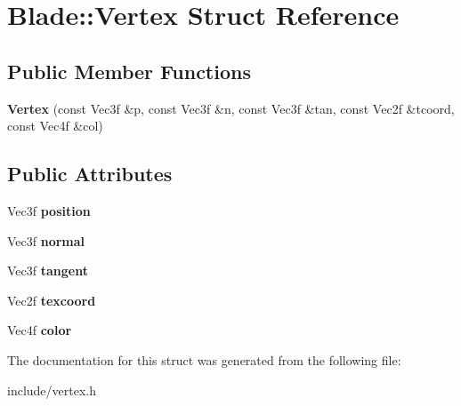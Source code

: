 \hypertarget{struct_blade_1_1_vertex}{}\section{Blade\+:\+:Vertex Struct Reference}
\label{struct_blade_1_1_vertex}
\subsection*{Public Member Functions}
\begin{DoxyCompactItemize}
\item 
\mbox{\label{struct_blade_1_1_vertex_a124be4a59e2e11a4c052c14c83dfa5b4}} 
{\bfseries Vertex} (const Vec3f \&p, const Vec3f \&n, const Vec3f \&tan, const Vec2f \&tcoord, const Vec4f \&col)
\end{DoxyCompactItemize}
\subsection*{Public Attributes}
\begin{DoxyCompactItemize}
\item 
\mbox{\label{struct_blade_1_1_vertex_a5f8ed1916e86395b313e9697f8c2a200}} 
Vec3f {\bfseries position}
\item 
\mbox{\label{struct_blade_1_1_vertex_a79806efa010e65dbc3fe9212b912a4b1}} 
Vec3f {\bfseries normal}
\item 
\mbox{\label{struct_blade_1_1_vertex_a2de2facee67859a8e1a43efb9c4d4655}} 
Vec3f {\bfseries tangent}
\item 
\mbox{\label{struct_blade_1_1_vertex_adaedc7401e707088d87e726d9365ae3b}} 
Vec2f {\bfseries texcoord}
\item 
\mbox{\label{struct_blade_1_1_vertex_a8288412f692f86c78b762498b32a03ef}} 
Vec4f {\bfseries color}
\end{DoxyCompactItemize}


The documentation for this struct was generated from the following file\+:\begin{DoxyCompactItemize}
\item 
include/vertex.\+h\end{DoxyCompactItemize}

